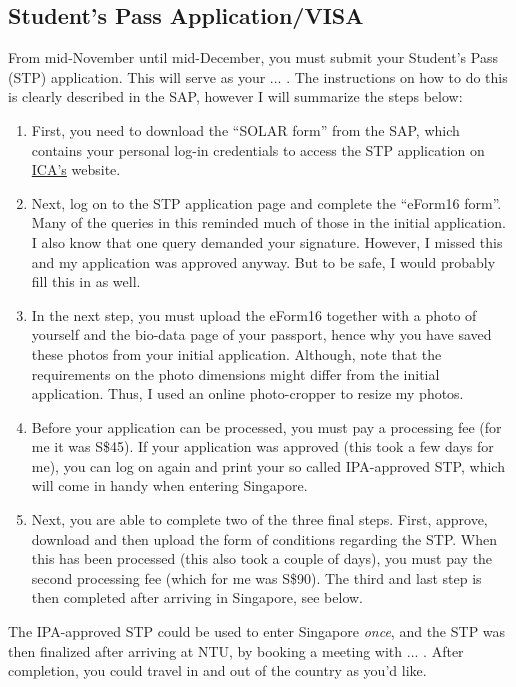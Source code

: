 \subsection*{Student's Pass Application/VISA}
{}
From mid-November until mid-December, you must submit your Student's Pass (STP) application. This will serve as your ... . The instructions on how to do this is clearly described in the SAP, however I will summarize the steps below:
\begin{enumerate}
    \item First, you need to download the ``SOLAR form'' from the SAP, which contains your personal log-in credentials to access the STP application on \href{https://eservices.ica.gov.sg/solar/index.xhtml}{ICA's} website. 
    \item Next, log on to the STP application page and complete the ``eForm16 form''. Many of the queries in this reminded much of those in the initial application. I also know that one query demanded your signature. However, I missed this and my application was approved anyway. But to be safe, I would probably fill this in as well.
    \item In the next step, you must upload the eForm16 together with a photo of yourself and the bio-data page of your passport, hence why you have saved these photos from your initial application. Although, note that the requirements on the photo dimensions might differ from the initial application. Thus, I used an online photo-cropper to resize my photos. 
    \item Before your application can be processed, you must pay a processing fee (for me it was S\$45). If your application was approved (this took a few days for me), you can log on again and print your so called IPA-approved STP, which will come in handy when entering Singapore. 
    \item Next, you are able to complete two of the three final steps. First, approve, download and then upload the form of conditions regarding the STP. When this has been processed (this also took a couple of days), you must pay the second processing fee (which for me was S\$90). The third and last step is then completed after arriving in Singapore, see below.
\end{enumerate}
The IPA-approved STP could be used to enter Singapore \textit{once}, and the STP was then finalized after arriving at NTU, by booking a meeting with ... . After completion, you could travel in and out of the country as you'd like. 
 
